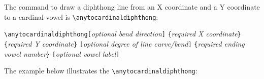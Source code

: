 \documentclass{article}
\def\\{}%
\begin{document}
The command to draw a diphthong line from an X coordinate and a Y coordinate to a cardinal vowel is \verb|\anytocardinaldiphthong|:

\medskip
\qquad \verb+\anytocardinaldiphthong[+\textit{optional bend direction}\verb+]+\\
\qquad\hspace*{16em} \verb+{+\textit{required X coordinate}\verb+}+\\
\qquad\hspace*{16em} \verb+{+\textit{required Y coordinate}\verb+}+\\
\qquad\hspace*{16em} \verb+[+\textit{optional degree of line curve/bend}\verb+]+\\
\qquad\hspace*{16em} \verb+{+\textit{required ending vowel number}\verb+}+\\
\qquad\hspace*{16em} \verb+[+\textit{optional vowel label}\verb+]+\\
\bigskip

\noindent
The example below illustrates the \verb|\anytocardinaldiphthong|:
\end{document}
